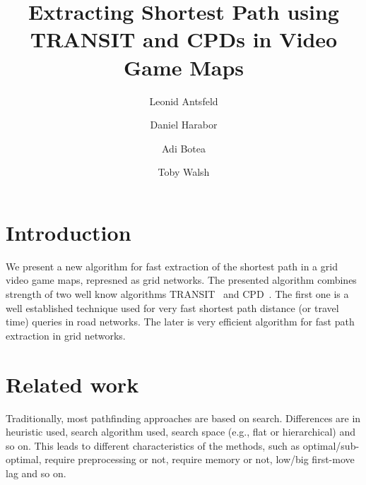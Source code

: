 \documentclass[runningheads,a4paper]{llncs}
\begin{document}
\mainmatter  %

\title{Extracting Shortest Path using TRANSIT and CPDs in Video Game Maps}


%
%
\author{Leonid Antsfeld \and Daniel Harabor \and Adi  Botea  \and Toby Walsh}



\maketitle

\section{Introduction}
We present a new algorithm for fast extraction of the shortest path in a grid video game maps, represned as grid networks.
The presented algorithm combines strength of two well know algorithms TRANSIT~\cite{bast06} and CPD~\cite{sanka05}.
The first one is a well established technique used for very fast shortest path distance (or travel time) queries in road networks.
The later is very efficient algorithm for fast path extraction in grid networks.

\section{Related work}

Traditionally, most pathfinding approaches are based on search.
Differences are in heuristic used, search algorithm used, search space (e.g.,
flat or hierarchical) and so on. This leads to different characteristics of the
methods, such as optimal/sub-optimal, require preprocessing or not, require
memory or not, low/big first-move lag and so on.
\end{document}
